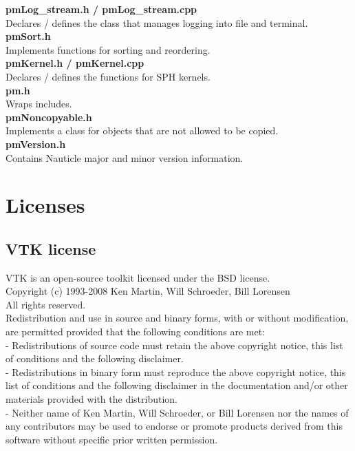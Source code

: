 \documentclass[a4paper,12pt,openany]{book}
\theoremstyle{break}
\begin{document}
\textbf{pmLog\_stream.h / pmLog\_stream.cpp} \\
Declares / defines the class that manages logging into file and terminal. \\

\textbf{pmSort.h}\\
Implements functions for sorting and reordering.\\

\textbf{pmKernel.h / pmKernel.cpp} \\
Declares / defines the functions for SPH kernels.\\

\textbf{pm.h}\\
Wraps includes.\\

\textbf{pmNoncopyable.h}\\
Implements a class for objects that are not allowed to be copied.\\

\textbf{pmVersion.h}\\
Contains Nauticle major and minor version information.\\


\section{Licenses}
\subsection{VTK license}
VTK is an open-source toolkit licensed under the BSD license.\\
Copyright (c) 1993-2008 Ken Martin, Will Schroeder, Bill Lorensen \\
All rights reserved.\\
Redistribution and use in source and binary forms, with or without modification, are permitted provided that the following conditions are met: \\
- Redistributions of source code must retain the above copyright notice, this list of conditions and the following disclaimer. \\
- Redistributions in binary form must reproduce the above copyright notice, this list of conditions and the following disclaimer in the documentation and/or other materials provided with the distribution. \\
- Neither name of Ken Martin, Will Schroeder, or Bill Lorensen nor the names of any contributors may be used to endorse or promote products derived from this software without specific prior written permission.\\
\end{document}
